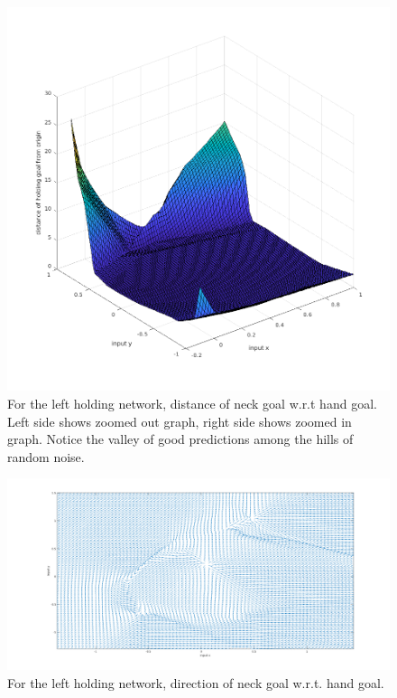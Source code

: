 \documentclass[12pt]{article}
\begin{document}
\begin{figure}[!htb]
\includegraphics[width=\linewidth]{figures/left/zoomed_in.png}
\endminipage\hfill
\caption{For the left holding network, distance of neck goal w.r.t hand goal. Left side shows zoomed out graph, right side shows zoomed in graph. Notice the valley of good predictions among the hills of random noise.}
\label{fig:lm}
\end{figure}
\begin{figure}[!htb]
\includegraphics[width=\linewidth]{figures/left/direction.png}
\endminipage\hfill
\caption{For the left holding network, direction of neck goal w.r.t. hand goal.}
\label{fig:ld}
\end{figure}
\end{document}
